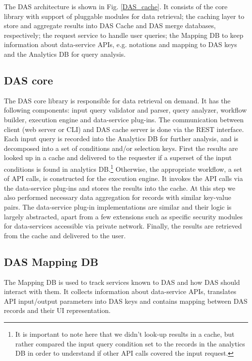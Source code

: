 \documentclass[3p,times]{elsarticle}
\begin{document}
The DAS architecture is shown in Fig. \ref{DAS_cache}. It consists of
the core library with support of pluggable modules for data retrieval;
the caching layer to store and aggregate results into DAS Cache and DAS merge
databases, respectively; the
request service to handle user queries;
the Mapping DB to keep information about data-service APIs, e.g.
notations and mapping to DAS keys and the
Analytics DB for query analysis.

\subsection{DAS core\label{DAS_core}}
The DAS core library is responsible for data retrieval on demand. 
It has the following components: input query validator and parser,
query analyzer, workflow builder, execution engine and data-service 
plug-ins. The communication between client (web server or CLI) and 
DAS cache server is done via the REST \cite{REST} interface. 
Each input query is recorded into the Analytics DB for further 
analysis, and is decomposed into a set of conditions and/or selection keys.
First the results are looked up in a cache and delivered to the requester
if a superset of the input conditions is found in analytics DB.\footnote{It is important
to note here that we didn't look-up results in a cache, but rather
compared the input query condition set to the records in the analytics DB 
in order to understand if other API calls covered the input request.}
Otherwise, the appropriate workflow, a set of API calls, is constructed
for the execution engine. It invokes the API calls via the data-service
plug-ins and stores the results into the cache. At this step we also
performed necessary data aggregation for records with similar key-value
pairs. The data-service plug-in implementations are similar and their 
logic is largely abstracted, apart from a few extensions such as specific
security modules for data-services accessible via private network.
Finally, the results are retrieved from the cache and delivered to the user. 


\subsection{DAS Mapping DB\label{MappingDB}}
The Mapping DB is used to track services known to DAS and how DAS should interact with them.
It collects
information about data-service APIs, translates API input/output
parameters into DAS keys and contains mapping between DAS records
and their UI representation.
\end{document}
